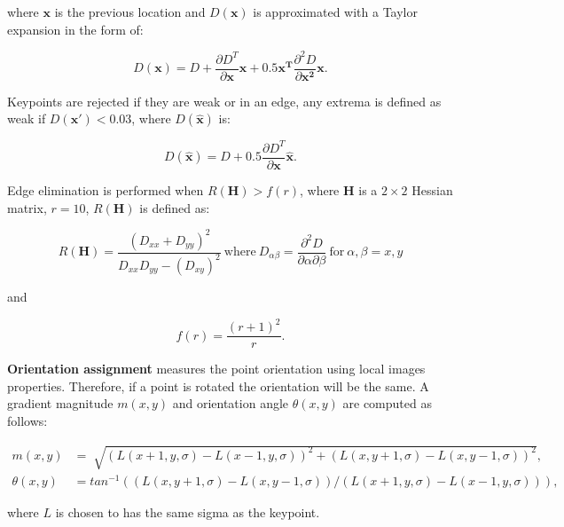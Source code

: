 \documentclass[12pt]{article}
\begin{document}
where $\mathbf{x}$ is the previous location and $D(\mathbf{x})$ is approximated with a Taylor expansion in the form of:

\begin{equation}
D(\mathbf{x}) = D + \frac{ \partial D^T}{\partial \mathbf{x}} \mathbf{x} + 0.5 \mathbf{x^T} \frac{\partial^2 D}{\partial \mathbf{x^2}}\mathbf{x}.
\end{equation}

Keypoints are rejected if they are weak or in an edge, any extrema is defined as weak if $D(\mathbf{x'}) < 0.03$, where $D(\mathbf{\hat{x}})$ is:

\begin{equation}
D(\mathbf{\hat{x}}) = D + 0.5 \frac{\partial D^T}{\partial \mathbf{x}}\mathbf{\hat{x}}.
\end{equation}

Edge elimination is performed when $R(\mathbf{H}) > f(r)$, where $\mathbf{H}$ is a $2 \times 2$ Hessian matrix, $r = 10$, $R(\mathbf{H})$ is defined as:

\begin{equation}
R(\mathbf{H})= \frac{ (D_{xx} + D_{yy})^2 }{ D_{xx} D_{yy} - (D_{xy})^2} ~ \text{where} ~ D_{\alpha \beta} = \frac{\partial^2 D}{\partial \alpha \partial \beta} ~  \text{for} ~ \alpha, \beta = x, y
\end{equation}

and 

\begin{equation}
f(r) = \frac{(r + 1)^2}{r}.
\end{equation}

\textbf{Orientation assignment} measures the point orientation using local images properties.
Therefore, if a point is rotated the orientation will be the same.
A gradient magnitude $m(x,y)$ and orientation angle $\theta(x,y)$ are computed as follows:

\begin{equation}
\begin{aligned}
	m(x,y) &= \sqrt[]{(L(x+1,y,\sigma) - L(x-1,y,\sigma))^2 + (L(x,y+1,\sigma) - L(x,y-1,\sigma))^2}, \\
	\theta(x,y) &= tan^{-1} \left( \left( L(x,y+1,\sigma) - L(x, y-1, \sigma) \right) / \left( L(x+1,y,\sigma) - L(x-1, y, \sigma) \right) \right),
\end{aligned} \label{eq:conv}
\end{equation}

where $L$ is chosen to has the same sigma as the keypoint.
\end{document}
